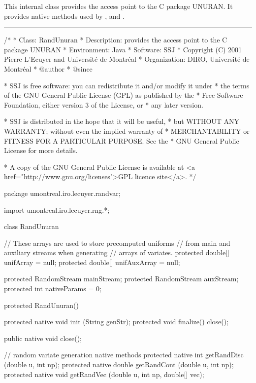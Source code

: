 
This internal class provides the access point to the C
package UNURAN.  It provides native methods used
by ,  and
.

\bigskip\hrule

\begin{code}
\begin{hide}
/*
 * Class:        RandUnuran
 * Description:  provides the access point to the C package UNURAN
 * Environment:  Java
 * Software:     SSJ 
 * Copyright (C) 2001  Pierre L'Ecuyer and Université de Montréal
 * Organization: DIRO, Université de Montréal
 * @author       
 * @since

 * SSJ is free software: you can redistribute it and/or modify it under
 * the terms of the GNU General Public License (GPL) as published by the
 * Free Software Foundation, either version 3 of the License, or
 * any later version.

 * SSJ is distributed in the hope that it will be useful,
 * but WITHOUT ANY WARRANTY; without even the implied warranty of
 * MERCHANTABILITY or FITNESS FOR A PARTICULAR PURPOSE.  See the
 * GNU General Public License for more details.

 * A copy of the GNU General Public License is available at
   <a href="http://www.gnu.org/licenses">GPL licence site</a>.
 */
\end{hide}
package umontreal.iro.lecuyer.randvar;\begin{hide}
import umontreal.iro.lecuyer.rng.*;
\end{hide}

class RandUnuran\begin{hide} {

   // These arrays are used to store precomputed uniforms
   // from main and auxiliary streams when generating
   // arrays of variates.
   protected double[] unifArray = null;
   protected double[] unifAuxArray = null;

   protected RandomStream mainStream;
   protected RandomStream auxStream;
   protected int nativeParams = 0;

   protected RandUnuran() {}

   protected native void init (String genStr);
   protected void finalize() {
      close();
   }

   public native void close();

   // random variate generation native methods
   protected native int getRandDisc (double u, int np);
   protected native double getRandCont (double u, int np);
   protected native void getRandVec (double u, int np, double[] vec);

}
\end{hide}
\end{code}
